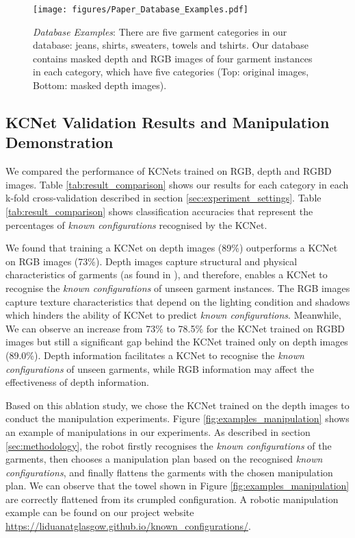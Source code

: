 \documentclass[conference]{IEEEtran}
\begin{document}
\begin{figure*}[tpbh]
    \centering
    \texttt{[image: figures/Paper\_Database\_Examples.pdf]}
    \caption{\textit{Database Examples}: There are five garment categories in our database: jeans, shirts, sweaters, towels and tshirts. Our database contains masked depth and RGB images of four garment instances in each category, which have five categories (Top: original images, Bottom: masked depth images).}
    \label{fig:database_examples}
\end{figure*}


\subsection{KCNet Validation Results and Manipulation Demonstration \label{subsec:results_and_demonstration}}
We compared the performance of KCNets trained on RGB, depth and RGBD images. Table \ref{tab:result_comparison} shows our results for each category in each k-fold cross-validation described in section \ref{sec:experiment_settings}.  Table \ref{tab:result_comparison} shows classification accuracies that represent the percentages of \textit{known configurations} recognised by the KCNet.

We found that training a KCNet on depth images (89\%) outperforms a KCNet on RGB images (73\%). Depth images capture structural and physical characteristics of garments (as found in \cite{duan2022physnet}), and therefore, enables a KCNet to recognise the \textit{known configurations} of unseen garment instances. The RGB images capture texture characteristics that depend on the lighting condition and shadows which hinders the ability of KCNet to predict \textit{known configurations}. Meanwhile, We can observe an increase from 73\% to 78.5\% for the KCNet trained on RGBD images but still a significant gap behind the KCNet trained only on depth images (89.0\%). Depth information facilitates a KCNet to recognise the \textit{known configurations} of unseen garments, while RGB information may affect the effectiveness of depth information.

Based on this ablation study, we chose the KCNet trained on the depth images to conduct the manipulation experiments. Figure \ref{fig:examples_manipulation} shows an example of manipulations in our experiments. As described in section \ref{sec:methodology}, the robot firstly recognises the \textit{known configurations} of the garments, then chooses a manipulation plan based on the recognised \textit{known configurations}, and finally flattens the garments with the chosen manipulation plan. We can observe that the towel shown in Figure \ref{fig:examples_manipulation} are correctly flattened from its crumpled configuration. A robotic manipulation example can be found on our project website \url{https://liduanatglasgow.github.io/known_configurations/}.
\end{document}
